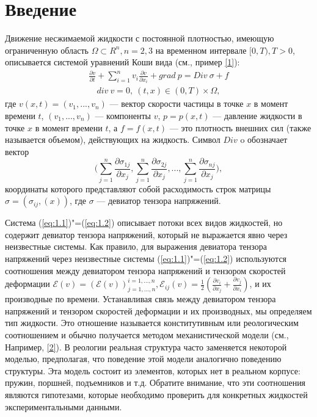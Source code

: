 \section{Введение}

Движение несжимаемой жидкости с постоянной плотностью, имеющую ограниченную область $\Omega\subset R^n, n=2,3$ на временном интервале 
$[0,T), T>0$, описывается системой уравнений Коши вида (см., пример \hyperlink{L1}{[1]}):
\begin{equation}\label{eq:1.1}
    \begin{gathered}
        \frac{\partial v}{\partial t}+\sum_{i=1}^n v_i\frac{\partial v}{\partial x_i}+ grad \ p=Div \ \sigma + f
    \end{gathered}
\end{equation}
\begin{equation}\label{eq:1.2}
    \begin{gathered}
        div \ v=0, \ (t,x)\in (0,T)\times\Omega,
    \end{gathered}
\end{equation}
где $v (x, t) = (v_1,...,v_n)$ --- вектор скорости частицы в точке $x$ в момент времени $t$, $(v_1,...,v_n)$ --- компоненты $v$,
$p = p (x, t)$ --- давление жидкости в точке $x$ в момент времени $t$, а $f = f (x, t)$ --- это плотность внешних сил 
(также называется объемом), действующих на жидкость. Символ $Div$ o обозначает вектор
$$\bigg(\sum_{j=1}^n\frac{\partial\sigma_{1j}}{\partial x_j},\sum_{j=1}^n\frac{\partial\sigma_{2j}}{\partial x_j},...,\sum_{j=1}^n\frac{\partial\sigma_{nj}}{\partial x_j}\bigg),$$
координаты которого представляют собой расходимость строк матрицы $\sigma = (\sigma_{ij}, (x))$, где $\sigma$ --- девиатор 
тензора напряжений.

Система (\ref{eq:1.1})"=(\ref{eq:1.2}) описывает потоки всех видов жидкостей, но содержит девиатор тензора напряжений, 
который не выражается явно через неизвестные системы. Как правило, для выражения девиатора тензора напряжений через 
неизвестные системы (\ref{eq:1.1})"=(\ref{eq:1.2}) используются соотношения между девиатором тензора напряжений и тензором 
скоростей деформации $\mathcal{E}(v)=(\mathcal{E}(v))^{i=1,...,n}_{j=1,...,n},\mathcal{E}_{ij}(v)=\frac{1}{2}(\frac{\partial v_i}{\partial x_j}+\frac{\partial v_j}{\partial x_i})$, 
и их производные по времени. Устанавливая связь между девиатором тензора напряжений и тензором скоростей деформации и их 
производных, мы определяем тип жидкости. Это отношение называется конститутивным или реологическим соотношением и обычно 
получается методом механистической модели (см., Например, \hyperlink{L2}{[2]}). В реологии реальная структура часто заменяется некоторой 
моделью, предполагая, что поведение этой модели аналогично поведению структуры.  Эта модель состоит из элементов, которых 
нет в реальном корпусе: пружин, поршней, подъемников и т.д. Обратите внимание, что эти соотношения являются гипотезами, 
которые необходимо проверить для конкретных жидкостей экспериментальными данными. 

